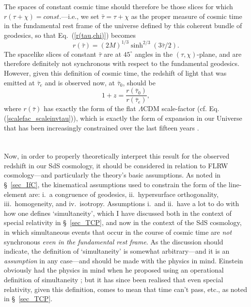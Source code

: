 \documentclass[11pt]{article}
\begin{document}
\begin{appendix}
The spaces of constant cosmic time should therefore be those slices for which $r(\tau+\chi)=const.$---i.e., we set $\bar{\tau}=\tau+\chi$ as the proper measure of cosmic time in the fundamental rest frame of the universe defined by this coherent bundle of geodesics, so that Eq.~(\ref{r(tau,chi)}) becomes
\begin{equation}
r(\bar{\tau})=(2M)^{1/3}\sinh^{2/3}\left(3\bar{\tau}/2\right).\label{SdS_scalefac}
\end{equation}
The spacelike slices of constant $\bar{\tau}$ are at $45^{\circ}$ angles in the $(\tau,\chi)$-plane, and are therefore definitely not synchronous with respect to the fundamental geodesics. However, given this definition of cosmic time, the redshift of light that was emitted at $\bar{\tau}_e$ and is observed now, at $\bar{\tau}_0$, should be
\begin{equation}
1+z=\frac{r(\bar\tau_0)}{r(\bar\tau_e)},\label{z_SdS}
\end{equation}
where $r(\bar{\tau})$ has exactly the form of the flat $\Lambda$CDM scale-factor (cf. Eq. (\ref{scalefac_scaleinvtau})), which is exactly the form of expansion in our Universe that has been increasingly constrained over the last fifteen years \cite{SNe Ia}.\\\\\\
Now, in order to properly theoretically interpret this result for the observed redshift in our SdS cosmology, it should be considered in relation to FLRW cosmology---and particularly the theory's basic assumptions. As noted in \S~\ref{sec_IfC}, the kinematical assumptions used to constrain the form of the line-element are: i.\ a congruence of geodesics, ii.\ hypersurface orthogonality, iii.\ homogeneity, and iv.\ isotropy. Assumptions i.\ and ii.\ have a lot to do with how one defines `simultaneity', which I have discussed both in the context of special relativity in \S~\ref{sec_TCP}, and now in the context of the SdS cosmology, in which simultaneous events that occur in the course of cosmic time are \textit{not} synchronous \textit{even in the fundamental rest frame}. As the discussion should indicate, the definition of `simultaneity' is somewhat arbitrary---and it is an \textit{assumption} in any case---and should be made with the physics in mind. Einstein obviously had the physics in mind when he proposed using an operational definition of simultaneity \cite{Einstein1905}; but it has since been realised that even special relativity, given this definition, comes to mean that time can't pass, etc., as noted in \S~\ref{sec_TCP}. 


\end{appendix}
\end{document}

